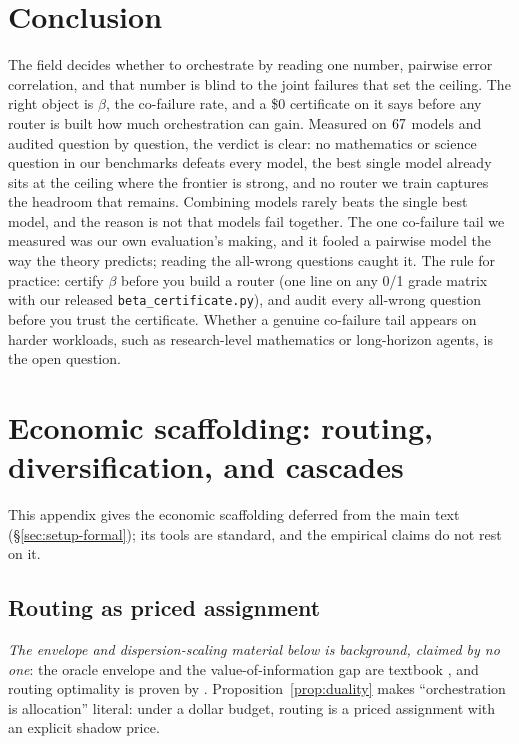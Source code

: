 \documentclass[11pt]{article}
\theoremstyle{plain}
\theoremstyle{definition}
\begin{document}
\section{Conclusion}
The field decides whether to orchestrate by reading one number, pairwise error correlation, and that number is blind to the
joint failures that set the ceiling. The right object is $\beta$, the co-failure rate, and a \$0 certificate on it says
before any router is built how much orchestration can gain. Measured on $67$ models and audited question by question, the
verdict is clear: no mathematics or science question in our benchmarks defeats every model, the best single model already sits
at the ceiling where the frontier is strong, and no router we train captures the headroom that remains. Combining models rarely
beats the single best model, and the reason is not that models fail together. The one co-failure tail we measured was our own
evaluation's making, and it fooled a pairwise model the way the theory predicts; reading the all-wrong questions caught it.
The rule for practice: certify $\beta$ before you build a router (one line on any 0/1 grade matrix with our released
\texttt{beta\_certificate.py}), and audit every all-wrong question before you trust the certificate. Whether a genuine co-failure tail appears on harder workloads, such as research-level mathematics or long-horizon
agents, is the open question.




\appendix
\section{Economic scaffolding: routing, diversification, and cascades}\label{app:econ}
This appendix gives the economic scaffolding deferred from the main text (\S\ref{sec:setup-formal}); its tools are standard, and the empirical claims do not rest on it.

\subsection{Routing as priced assignment}\label{sec:A}
\emph{The envelope and dispersion-scaling material below is background, claimed by no one}: the oracle envelope and the
value-of-information gap are textbook \citep{howard1966}, and routing optimality is proven by
\citet{dekoninck2024cascaderouting}. Proposition~\ref{prop:duality} makes ``orchestration
is allocation'' literal: under a dollar budget, routing is a priced assignment with an explicit shadow price.
\end{document}

